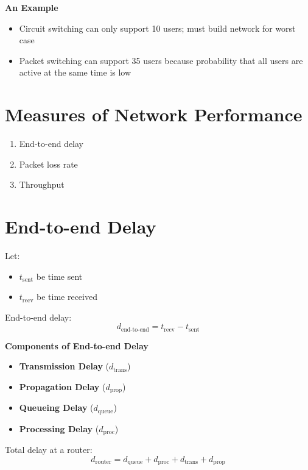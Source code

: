 \documentclass[9pt]{extarticle}
\begin{document}
\begin{multicols*}{3}
\textbf{An Example}
\begin{itemize}
    \item Circuit switching can only support 10 users; must build network for worst case
    \item Packet switching can support 35 users because probability that all users are active at the same time is low
\end{itemize}

{\color{sectioncolor}\section*{\centering Measures of Network Performance}}
\begin{enumerate}
    \item End-to-end delay
    \item Packet loss rate
    \item Throughput
\end{enumerate}

{\color{sectioncolor}\section*{\centering End-to-end Delay}}
Let:
\begin{itemize}
    \item \( t_{\text{sent}} \) be time sent
    \item \( t_{\text{recv}} \) be time received
\end{itemize}
End-to-end delay:
\[
d_{\text{end-to-end}} = t_{\text{recv}} - t_{\text{sent}}
\]

\textbf{Components of End-to-end Delay}
\begin{itemize}
    \item \textbf{Transmission Delay} (\( d_{\text{trans}} \))
    \item \textbf{Propagation Delay} (\( d_{\text{prop}} \))
    \item \textbf{Queueing Delay} (\( d_{\text{queue}} \))
    \item \textbf{Processing Delay} (\( d_{\text{proc}} \))
\end{itemize}
Total delay at a router:
\[
d_{\text{router}} = d_{\text{queue}} + d_{\text{proc}} + d_{\text{trans}} + d_{\text{prop}}
\]


\end{multicols*}
\end{document}
